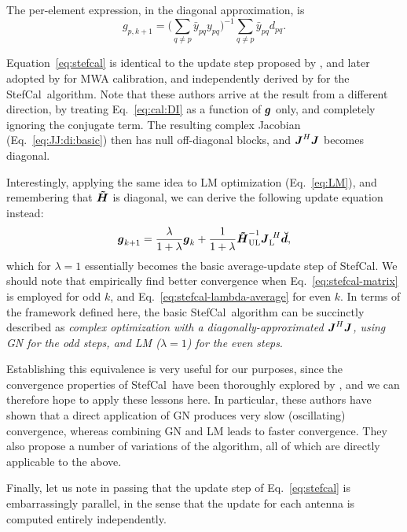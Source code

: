 \documentclass[useAMS,usenatbib]{mn2e}
\newcommand{\mat}[1]{{\bmath{#1}}}
\newcommand{\JJ}{\mat{J}} %
\newcommand{\HHa}{\mat{\tilde{H}}} %
\newcommand{\JHJ}{\JJ^H\JJ} %
\newcommand{\AUG}[1]{\bmath{\breve{#1}}}
\newcommand{\Dd}{\AUG{d}}
\newcommand{\LEFT}{\mathrm{L}}
\newcommand{\UL}{\mathrm{UL}}%
\newcommand{\StefCal}{{\sc StefCal}}
\numberwithin{equation}{section}
\begin{document}
The per-element expression, in the diagonal approximation, is
\begin{equation}
\label{eq:stefcal}
g_{p,k+1} = \big( \sum\limits_{q\ne p} \bar{y}_{pq} y_{pq} \big)^{-1} \sum\limits_{q\ne p} \bar{y}_{pq} d_{pq}.
\end{equation}

Equation~\ref{eq:stefcal} is identical to the update step proposed by \citet{ME4}, and later adopted by 
\citet{Mitchell-RTS} for MWA calibration, and independently derived by \citet{Stefcal} for the \StefCal\ algorithm. 
Note that these authors arrive at the result from a different 
direction, by treating Eq.~\ref{eq:cal:DI} as a function of $\bmath{g}$ only, and completely ignoring 
the conjugate term. 
The resulting complex Jacobian (Eq.~\ref{eq:JJ:di:basic}) then has null off-diagonal blocks, and $\JJ^H\JJ$ becomes 
diagonal.

Interestingly, applying the same idea to LM optimization (Eq.~\ref{eq:LM}), and remembering that $\HHa$ is 
diagonal, we can derive the following update equation instead:
\begin{equation}
\bmath{g}_{k+1} = \frac{\lambda}{1+\lambda}\bmath{g}_k + \frac{1}{1+\lambda} \HHa_{\UL}^{-1} \JJ_\LEFT^{~H} \Dd,
\label{eq:stefcal-lambda-average}
\end{equation}
which for $\lambda=1$ essentially becomes the basic average-update step of \StefCal. We should note that \citet{Stefcal}
empirically find better convergence when Eq.~\ref{eq:stefcal-matrix} is employed for odd $k$, and 
Eq.~\ref{eq:stefcal-lambda-average} for even $k$. In terms of the framework defined here, the basic \StefCal\ algorithm 
can be succinctly described as {\em complex optimization with a 
diagonally-approximated $\JHJ$, using GN for the odd steps, and LM ($\lambda=1$) for the even steps}.

Establishing this equivalence is 
very useful for our purposes, since the convergence properties of \StefCal\ have been thoroughly explored 
by \citet{Stefcal}, and we can therefore hope to apply these lessons here. In particular, these authors have shown 
that a direct application of GN produces very slow (oscillating) convergence, whereas combining GN and LM leads to faster convergence. They also propose a number of variations of the algorithm, all of which are 
directly applicable to the above.

Finally, let us note in passing that the update step of Eq.~\ref{eq:stefcal} is embarrassingly parallel, in the sense 
that the update for each antenna is computed entirely independently.
\end{document}
